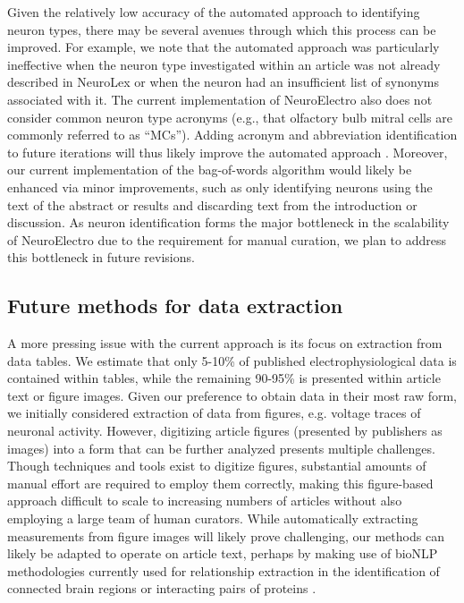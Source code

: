 \documentclass{template/frontiersSCNS} %
\begin{document}
Given the relatively low accuracy of the automated approach to identifying neuron types, there may be several avenues through which this process can be improved. 
For example, we note that the automated approach was particularly ineffective when the neuron type investigated within an article was not already described in NeuroLex or when the neuron had an insufficient list of synonyms associated with it.  
The current implementation of NeuroElectro also does not consider common neuron type acronyms (e.g., that olfactory bulb mitral cells are commonly referred to as ``MCs'').  
Adding acronym and abbreviation identification to future iterations will thus likely improve the automated approach \citep{okazaki_building_2006,french_using_2012}.  
Moreover, our current implementation of the bag-of-words algorithm would likely be enhanced via minor improvements, such as only identifying neurons using the text of the abstract or results and discarding text from the introduction or discussion. 
As neuron identification forms the major bottleneck in the scalability of NeuroElectro due to the requirement for manual curation, we plan to address this bottleneck in future revisions.  

\subsection{Future methods for data extraction}
A more pressing issue with the current approach is its focus on extraction from data tables.  
We estimate that only 5-10\% of published electrophysiological data is contained within tables, while the remaining 90-95\% is presented within article text or figure images.  
Given our preference to obtain data in their most raw form, we initially considered extraction of data from figures, e.g. voltage traces of neuronal activity.  
However, digitizing article figures (presented by publishers as images) into a form that can be further analyzed presents multiple challenges.  
Though techniques and tools exist to digitize figures, substantial amounts of manual effort are required to employ them correctly, making this figure-based approach difficult to scale to increasing numbers of articles without also employing a large team of human curators.  
While automatically extracting measurements from figure images will likely prove challenging, our methods can likely be adapted to operate on article text, perhaps by making use of bioNLP methodologies currently used for relationship extraction in the identification of connected brain regions \citep{french_application_2012} or interacting pairs of proteins \citep{kim_classifying_2011}. 
\end{document}
